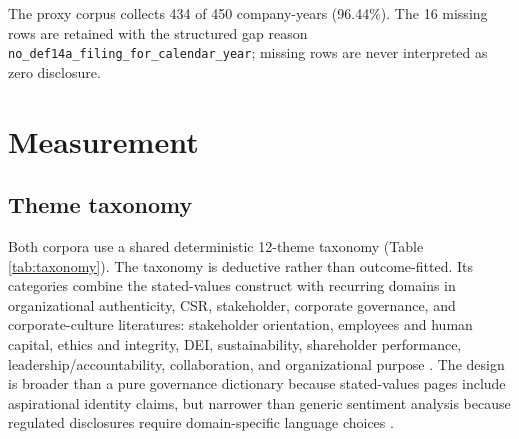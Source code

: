 \documentclass[11pt]{article}
\begin{document}
The proxy corpus collects 434 of 450 company-years (96.44\%). The 16 missing rows are retained with
the structured gap reason \texttt{no\_def14a\_filing\_for\_calendar\_year}; missing rows are never
interpreted as zero disclosure.

\section{Measurement}

\subsection{Theme taxonomy}

Both corpora use a shared deterministic 12-theme taxonomy (Table \ref{tab:taxonomy}). The taxonomy
is deductive rather than outcome-fitted. Its categories combine the stated-values construct with
recurring domains in organizational authenticity, CSR, stakeholder, corporate governance, and
corporate-culture literatures: stakeholder orientation, employees and human capital, ethics and
integrity, DEI, sustainability, shareholder performance, leadership/accountability, collaboration,
and organizational purpose \cite{pamphile2023,shabana2016,hawn2016,guiso2015}. The design is
broader than a pure governance dictionary because stated-values pages include aspirational identity
claims, but narrower than generic sentiment analysis because regulated disclosures require
domain-specific language choices \cite{loughran2011}.
\end{document}
